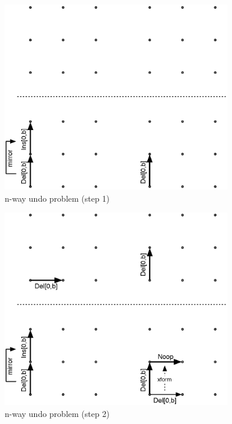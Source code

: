 \begin{figure}[H]
 \centering
 \includegraphics[width=10cm,height=8.36cm]{../../images/concepts_transformation-history-1.eps}
 \caption{n-way undo problem (step 1)}
 \label{fig:concepts.transformation-history-1}
\end{figure}

\begin{figure}[H]
 \centering
 \includegraphics[width=10cm,height=8.69cm]{../../images/concepts_transformation-history-2.eps}
 \caption{n-way undo problem (step 2)}
 \label{fig:concepts.transformation-history-2}
\end{figure}


